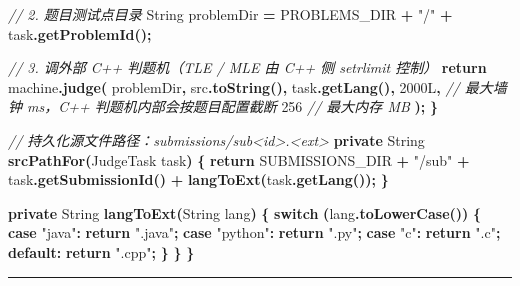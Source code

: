 \documentclass[
  11pt,
]{ctexart}
\newenvironment{Shaded}{\begin{snugshade}}{\end{snugshade}}
\newcommand{\BuiltInTok}[1]{#1}
\newcommand{\CommentTok}[1]{\textcolor[rgb]{0.56,0.35,0.01}{\textit{#1}}}
\newcommand{\ControlFlowTok}[1]{\textcolor[rgb]{0.13,0.29,0.53}{\textbf{#1}}}
\newcommand{\DecValTok}[1]{\textcolor[rgb]{0.00,0.00,0.81}{#1}}
\newcommand{\FunctionTok}[1]{\textcolor[rgb]{0.13,0.29,0.53}{\textbf{#1}}}
\newcommand{\KeywordTok}[1]{\textcolor[rgb]{0.13,0.29,0.53}{\textbf{#1}}}
\newcommand{\NormalTok}[1]{#1}
\newcommand{\OperatorTok}[1]{\textcolor[rgb]{0.81,0.36,0.00}{\textbf{#1}}}
\newcommand{\StringTok}[1]{\textcolor[rgb]{0.31,0.60,0.02}{#1}}
\begin{document}
\begin{Shaded}
\begin{Highlighting}[]
        \CommentTok{// 2. 题目测试点目录}
        \BuiltInTok{String}\NormalTok{ problemDir }\OperatorTok{=}\NormalTok{ PROBLEMS\_DIR }\OperatorTok{+} \StringTok{"/"} \OperatorTok{+}\NormalTok{ task}\OperatorTok{.}\FunctionTok{getProblemId}\OperatorTok{();}

        \CommentTok{// 3. 调外部 C++ 判题机（TLE / MLE 由 C++ 侧 setrlimit 控制）}
        \ControlFlowTok{return}\NormalTok{ machine}\OperatorTok{.}\FunctionTok{judge}\OperatorTok{(}
\NormalTok{            problemDir}\OperatorTok{,}
\NormalTok{            src}\OperatorTok{.}\FunctionTok{toString}\OperatorTok{(),}
\NormalTok{            task}\OperatorTok{.}\FunctionTok{getLang}\OperatorTok{(),}
            \DecValTok{2000L}\OperatorTok{,}   \CommentTok{// 最大墙钟 ms，C++ 判题机内部会按题目配置截断}
            \DecValTok{256}      \CommentTok{// 最大内存 MB}
        \OperatorTok{);}
    \OperatorTok{\}}

    \CommentTok{// 持久化源文件路径：submissions/sub\textless{}id\textgreater{}.\textless{}ext\textgreater{}}
    \KeywordTok{private} \BuiltInTok{String} \FunctionTok{srcPathFor}\OperatorTok{(}\NormalTok{JudgeTask task}\OperatorTok{)} \OperatorTok{\{}
        \ControlFlowTok{return}\NormalTok{ SUBMISSIONS\_DIR }\OperatorTok{+} \StringTok{"/sub"} \OperatorTok{+}\NormalTok{ task}\OperatorTok{.}\FunctionTok{getSubmissionId}\OperatorTok{()}
             \OperatorTok{+} \FunctionTok{langToExt}\OperatorTok{(}\NormalTok{task}\OperatorTok{.}\FunctionTok{getLang}\OperatorTok{());}
    \OperatorTok{\}}

    \KeywordTok{private} \BuiltInTok{String} \FunctionTok{langToExt}\OperatorTok{(}\BuiltInTok{String}\NormalTok{ lang}\OperatorTok{)} \OperatorTok{\{}
        \ControlFlowTok{switch} \OperatorTok{(}\NormalTok{lang}\OperatorTok{.}\FunctionTok{toLowerCase}\OperatorTok{())} \OperatorTok{\{}
            \ControlFlowTok{case} \StringTok{"java"}\OperatorTok{:}   \ControlFlowTok{return} \StringTok{".java"}\OperatorTok{;}
            \ControlFlowTok{case} \StringTok{"python"}\OperatorTok{:} \ControlFlowTok{return} \StringTok{".py"}\OperatorTok{;}
            \ControlFlowTok{case} \StringTok{"c"}\OperatorTok{:}      \ControlFlowTok{return} \StringTok{".c"}\OperatorTok{;}
            \KeywordTok{default}\OperatorTok{:}       \ControlFlowTok{return} \StringTok{".cpp"}\OperatorTok{;}
        \OperatorTok{\}}
    \OperatorTok{\}}
\OperatorTok{\}}
\end{Highlighting}
\end{Shaded}

\begin{center}\rule{0.5\linewidth}{0.5pt}\end{center}
\end{document}
